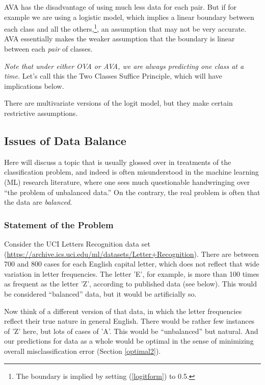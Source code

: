 AVA has the disadvantage of using much less data for each pair. But if
for example we are using a logistic model, which implies a linear
boundary between each class and all the others,\footnote{The boundary is
implied by setting (\ref{logitform}) to 0.5.}, an assumption that may
not be very accurate. AVA essentially makes the weaker assumption that
the boundary is linear between each {\it pair} of classes.

{\it Note that under either OVA or AVA, we are always predicting one
class at a time.}  Let's call this the Two Classes Suffice Principle,
which will have implications below.

There are multivariate versions of the logit model, but they make
certain restrictive assumptions.

\subsection{Issues of Data Balance}
\label{ymarg}

Here will discuss a topic that is usually  glossed over in treatments of
the classification problem, and indeed is often misunderstood in the
machine learning (ML) research literature, where one sees much
questionable handwringing over ``the problem of unbalanced data.''  On
the contrary, the real problem is often that the data are {\it
balanced}.

\subsubsection{Statement of the Problem}

Consider the UCI Letters Recognition data set
(\url{https://archive.ics.uci.edu/ml/datasets/Letter+Recognition}).
There are between 700 and 800 cases for each English capital letter,
which does not reflect that wide variation in letter frequencies.  The
letter 'E', for example, is more than 100 times as frequent as the
letter 'Z', according to published data (see below).  This would be
considered ``balanced'' data, but it would be artificially so.

Now think of a different version of that data, in which the
letter frequencies reflect their true nature in general English.  There
would be rather few instances of 'Z' here, but lots of cases of 'A'.
This would be ``unbalanced'' but natural.  And our predictions for data
as a whole would be optimal in the sense of minimizing overall
misclassification error (Section \ref{optimal2}).  

